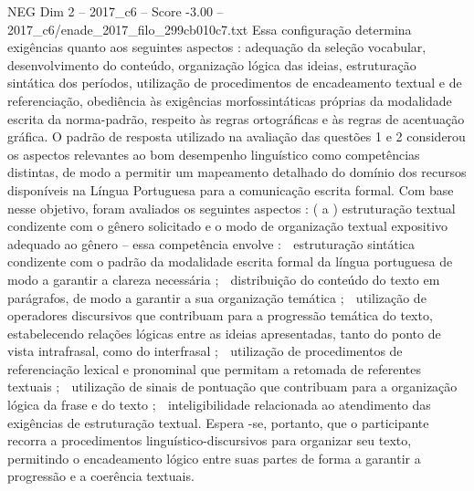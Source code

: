 \begin{textsample}{NEG Dim 2 – 2017\_c6 – Score -3.00 – 2017\_c6/enade\_2017\_filo\_299cb010c7.txt}
Essa configuração determina exigências quanto aos seguintes aspectos : adequação da seleção vocabular, desenvolvimento do conteúdo, organização lógica das ideias, estruturação sintática dos períodos, utilização de procedimentos de encadeamento textual e de referenciação, obediência às exigências morfossintáticas próprias da modalidade escrita da norma-padrão, respeito às regras ortográficas e às regras de acentuação gráfica.
O padrão de resposta utilizado na avaliação das questões 1 e 2 considerou os aspectos relevantes ao bom desempenho linguístico como competências distintas, de modo a permitir um mapeamento detalhado do domínio dos recursos disponíveis na Língua Portuguesa para a comunicação escrita formal.
Com base nesse objetivo, foram avaliados os seguintes aspectos : ( a ) estruturação textual condizente com o gênero solicitado e o modo de organização textual expositivo adequado ao gênero – essa competência envolve :  estruturação sintática condizente com o padrão da modalidade escrita formal da língua portuguesa de modo a garantir a clareza necessária ;  distribuição do conteúdo do texto em parágrafos, de modo a garantir a sua organização temática ;  utilização de operadores discursivos que contribuam para a progressão temática do texto, estabelecendo relações lógicas entre as ideias apresentadas, tanto do ponto de vista intrafrasal, como do interfrasal ;  utilização de procedimentos de referenciação lexical e pronominal que permitam a retomada de referentes textuais ;  utilização de sinais de pontuação que contribuam para a organização lógica da frase e do texto ;  inteligibilidade relacionada ao atendimento das exigências de estruturação textual.
Espera -se, portanto, que o participante recorra a procedimentos linguístico-discursivos para organizar seu texto, permitindo o encadeamento lógico entre suas partes de forma a garantir a progressão e a coerência textuais.

\end{textsample}
